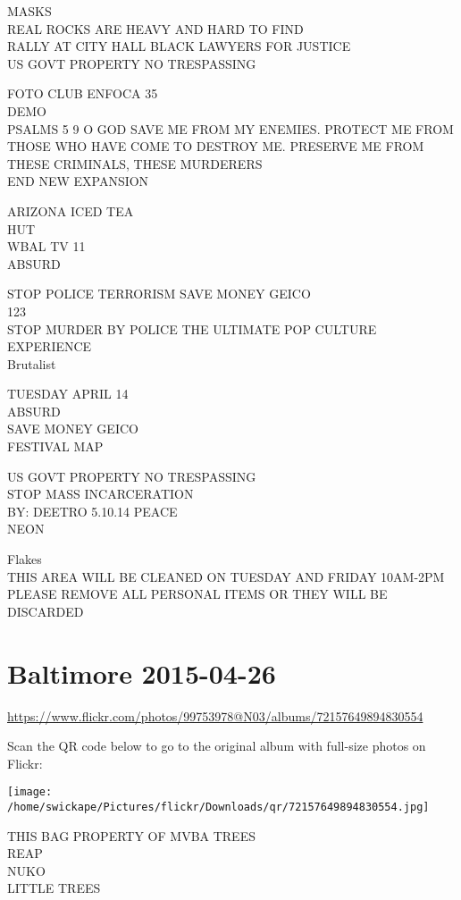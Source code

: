 \documentclass[10pt,letterpaper]{article}
\begin{document}
MASKS\\
REAL ROCKS ARE HEAVY AND HARD TO FIND\\
RALLY AT CITY HALL BLACK LAWYERS FOR JUSTICE\\
US GOVT PROPERTY NO TRESPASSING

FOTO CLUB ENFOCA 35\\
DEMO\\
PSALMS 5 9 O GOD SAVE ME FROM MY ENEMIES.  PROTECT ME FROM THOSE WHO HAVE COME TO DESTROY ME.  PRESERVE ME FROM THESE CRIMINALS, THESE MURDERERS\\
END NEW EXPANSION

ARIZONA ICED TEA\\
HUT\\
WBAL TV 11\\
ABSURD

STOP POLICE TERRORISM SAVE MONEY GEICO\\
123\\
STOP MURDER BY POLICE THE ULTIMATE POP CULTURE EXPERIENCE\\
Brutalist

TUESDAY APRIL 14\\
ABSURD\\
SAVE MONEY GEICO\\
FESTIVAL MAP

US GOVT PROPERTY NO TRESPASSING\\
STOP MASS INCARCERATION\\
BY: DEETRO 5.10.14 PEACE\\
NEON

Flakes\\
THIS AREA WILL BE CLEANED ON TUESDAY AND FRIDAY 10AM{-}2PM PLEASE REMOVE ALL PERSONAL ITEMS OR THEY WILL BE DISCARDED


\section*{Baltimore 2015-04-26}

\url{https://www.flickr.com/photos/99753978@N03/albums/72157649894830554}

Scan the QR code below to go to the original album with full-size photos on Flickr:

\texttt{[image: /home/swickape/Pictures/flickr/Downloads/qr/72157649894830554.jpg]}


THIS BAG PROPERTY OF MVBA TREES\\
REAP\\
NUKO\\
LITTLE TREES
\end{document}
